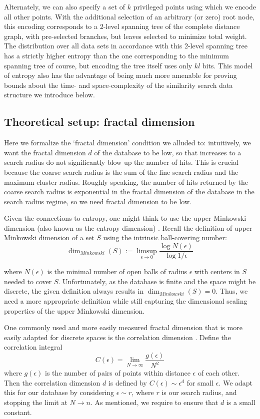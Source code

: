 \documentclass{amsbook}
\theoremstyle{definition}
\theoremstyle{remark}
\numberwithin{equation}{section}
\begin{document}
Alternately, we can also specify a set of $k$ privileged points using which we encode all other points.
With the additional selection of an arbitrary (or zero) root node, this encoding corresponds to a 2-level spanning tree of the complete distance graph, with pre-selected branches, but leaves selected to minimize total weight.
The distribution over all data sets in accordance with this 2-level spanning tree has a strictly higher entropy than the one corresponding to the minimum spanning tree of course, but encoding the tree itself uses only $kl$ bits.
This model of entropy also has the advantage of being much more amenable for proving bounds about the time- and space-complexity of the similarity search data structure we introduce below.

\subsection{Theoretical setup: fractal dimension}
Here we formalize the `fractal dimension' condition we alluded to: intuitively, we want the fractal dimension $d$ of the database to be low, so that increases to a search radius do not significantly blow up the number of hits.
This is crucial because the coarse search radius is the sum of the fine search radius and the maximum cluster radius.
Roughly speaking, the number of hits returned by the coarse search radius is exponential in the fractal dimension of the database in the search radius regime, so we need fractal dimension to be low.

Given the connections to entropy, one might think to use the upper Minkowski dimension (also known as the entropy dimension) \cite{falconer2013fractal}.
Recall the definition of upper Minkowski dimension of a set $S$ using the intrinsic ball-covering number:
\[
    \dim_{Minkowski}(S) := \limsup_{\epsilon \to 0} \frac{\log N(\epsilon)}{\log 1/\epsilon}
\]

where $N(\epsilon)$ is the minimal number of open balls of radius $\epsilon$ with centers in $S$ needed to cover $S$.
Unfortunately, as the database is finite and the space might be discrete, the given definition always results in $\dim_{Minkowski}(S) = 0$.
Thus, we need a more appropriate definition while still capturing the dimensional scaling properties of the upper Minkowski dimension.

One commonly used and more easily measured fractal dimension that is more easily adapted for discrete spaces is the correlation dimension \cite{grassberger1984dimensions}.
Define the correlation integral
\[
    C(\epsilon) = \lim_{N \to \infty} \frac{g(\epsilon)}{N^2}
\]
where $g(\epsilon)$ is the number of pairs of points within distance $\epsilon$ of each other.
Then the correlation dimension $d$ is defined by $C(\epsilon) \sim \epsilon^d$ for small $\epsilon$.
We adapt this for our database by considering $\epsilon \sim r$, where $r$ is our search radius, and stopping the limit at $N \to n$.
As mentioned, we require to ensure that $d$ is a small constant.
\end{document}
